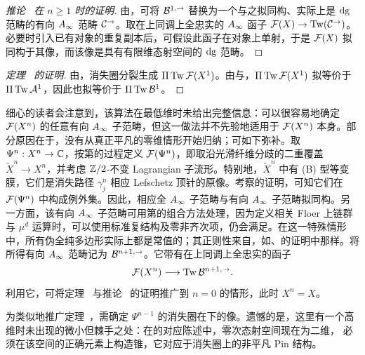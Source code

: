 \begin{proof}[推论~ 在 $n\ge1$ 时的证明]
由，可将 $\mathcal B^{1,\to}$ 替换为一个与之拟同构、实际上是 $\mathrm{dg}$ 范畴的有向 $A_\infty$ 范畴 $\mathcal C^\to$。取在上同调上全忠实的 $A_\infty$ 函子 $\mathcal F(X)\to\operatorname{Tw}(\mathcal C^\to)$。必要时引入已有对象的重复副本后，可假设此函子在对象上单射，于是 $\mathcal F(X)$ 拟同构于其像，而该像是具有有限维态射空间的 $\mathrm{dg}$ 范畴。
\end{proof}

\begin{proof}[定理~ 的证明]
由，消失圈分裂生成 $\Pi\operatorname{Tw}\mathcal F(X^1)$。由与，$\Pi\operatorname{Tw}\mathcal F(X^1)$ 拟等价于 $\Pi\operatorname{Tw}\mathcal A^1$，因此也拟等价于 $\Pi\operatorname{Tw}\mathcal B^1$。
\end{proof}

细心的读者会注意到，该算法在最低维时未给出完整信息：可以很容易地确定 $\mathcal F(X^n)$ 的任意有向 $A_\infty$ 子范畴，但这一做法并不先验地适用于 $\mathcal F(X^n)$ 本身。部分原因在于，没有从真正平凡的零维情形开始归纳；可如下弥补。取 $\Psi^n:X^n\to\mathbb C$，按第的过程定义 $\mathcal F(\Psi^n)$，即取沿光滑纤维分歧的二重覆盖 $\widetilde X^n\to X^n$，并考虑 $\mathbb Z/2$-不变 Lagrangian 子流形。特别地，$\widetilde X^n$ 中有 (B) 型等变膜，它们是消失路径 $\gamma_j^n$ 相应 Lefschetz 顶针的原像。考察的证明，可知它们在 $\mathcal F(\Psi^n)$ 中构成例外集。因此，相应全 $A_\infty$ 子范畴与有向 $A_\infty$ 子范畴拟同构。另一方面，该有向 $A_\infty$ 子范畴可用第的组合方法处理，因为定义相关 Floer 上链群与 $\mu^d$ 运算时，可以使用标准复结构及零非齐次项，仍会满足。在这一特殊情形中，所有伪全纯多边形实际上都是常值的；其正则性来自，如、的证明中那样。将所得有向 $A_\infty$ 范畴记为 $\mathcal B^{n+1,\to}$。它带有在上同调上全忠实的函子
\begin{equation}\label{eq:19.7}
\mathcal F(X^n)\longrightarrow\operatorname{Tw}\mathcal B^{n+1,\to}.
\end{equation}
利用它，可将定理~ 与推论~ 的证明推广到 $n=0$ 的情形，此时 $X^n=X$。

\begin{note}\label{st:19.10}
为类似地推广定理~，需确定 $\Psi^{n-1}$ 的消失圈在下的像。遗憾的是，这里有一个高维时未出现的微小但棘手之处：在的对应陈述中，零次态射空间现在为二维，
必须在该空间的正确元素上构造锥，它对应于消失圈上的非平凡 Pin 结构。
\end{note}
